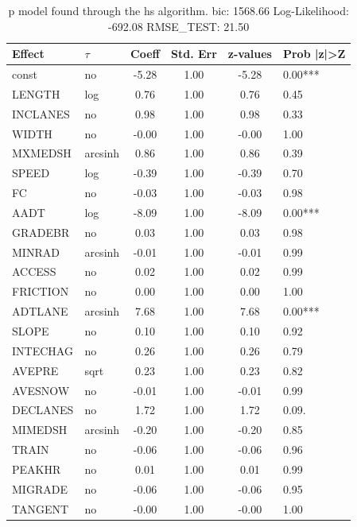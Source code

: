 \begin{table}
	\caption{p model found through the hs algorithm. bic: 1568.66 Log-Likelihood: -692.08 RMSE_TEST: 21.50}
	\begin{center}
		\begin{tabular}{|l|l|c|c|c|l|}
			\hline
			Effect & $\tau$ & Coeff & Std. Err & z-values & Prob |z|>Z \\
			\hline
			const & no & -5.28 & 1.00 & -5.28 & 0.00*** \\
			\hline
			LENGTH & log & 0.76 & 1.00 & 0.76 & 0.45 \\
			\hline
			INCLANES & no & 0.98 & 1.00 & 0.98 & 0.33 \\
			\hline
			WIDTH & no & -0.00 & 1.00 & -0.00 & 1.00 \\
			\hline
			MXMEDSH & arcsinh & 0.86 & 1.00 & 0.86 & 0.39 \\
			\hline
			SPEED & log & -0.39 & 1.00 & -0.39 & 0.70 \\
			\hline
			FC & no & -0.03 & 1.00 & -0.03 & 0.98 \\
			\hline
			AADT & log & -8.09 & 1.00 & -8.09 & 0.00*** \\
			\hline
			GRADEBR & no & 0.03 & 1.00 & 0.03 & 0.98 \\
			\hline
			MINRAD & arcsinh & -0.01 & 1.00 & -0.01 & 0.99 \\
			\hline
			ACCESS & no & 0.02 & 1.00 & 0.02 & 0.99 \\
			\hline
			FRICTION & no & 0.00 & 1.00 & 0.00 & 1.00 \\
			\hline
			ADTLANE & arcsinh & 7.68 & 1.00 & 7.68 & 0.00*** \\
			\hline
			SLOPE & no & 0.10 & 1.00 & 0.10 & 0.92 \\
			\hline
			INTECHAG & no & 0.26 & 1.00 & 0.26 & 0.79 \\
			\hline
			AVEPRE & sqrt & 0.23 & 1.00 & 0.23 & 0.82 \\
			\hline
			AVESNOW & no & -0.01 & 1.00 & -0.01 & 0.99 \\
			\hline
			DECLANES & no & 1.72 & 1.00 & 1.72 & 0.09. \\
			\hline
			MIMEDSH & arcsinh & -0.20 & 1.00 & -0.20 & 0.85 \\
			\hline
			TRAIN & no & -0.06 & 1.00 & -0.06 & 0.96 \\
			\hline
			PEAKHR & no & 0.01 & 1.00 & 0.01 & 0.99 \\
			\hline
			MIGRADE & no & -0.06 & 1.00 & -0.06 & 0.95 \\
			\hline
			TANGENT & no & -0.00 & 1.00 & -0.00 & 1.00 \\

\end{tabular}
\end{center}
\end{table}
